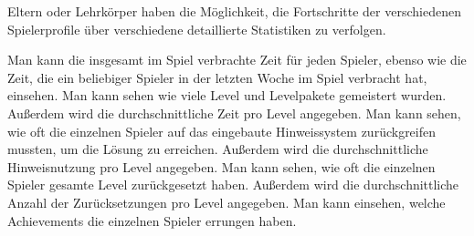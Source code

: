 \begin{requirements}
	Eltern oder Lehrkörper haben die Möglichkeit, die Fortschritte der verschiedenen Spielerprofile über verschiedene detaillierte Statistiken zu verfolgen.
	\begin{requirements}
		 Man kann die insgesamt im Spiel verbrachte Zeit für jeden Spieler, ebenso wie die Zeit, die ein beliebiger Spieler in der letzten Woche im Spiel verbracht hat, einsehen.
		 Man kann sehen wie viele Level und Levelpakete gemeistert wurden.
		Außerdem wird die durchschnittliche Zeit pro Level angegeben.
		 Man kann sehen, wie oft die einzelnen Spieler auf das eingebaute Hinweissystem zurückgreifen mussten, um die Lösung zu erreichen.
		Außerdem wird die durchschnittliche Hinweisnutzung pro Level angegeben.
		 Man kann sehen, wie oft die einzelnen Spieler gesamte Level zurückgesetzt haben.
		Außerdem wird die durchschnittliche Anzahl der Zurücksetzungen pro Level angegeben.
		 Man kann einsehen, welche Achievements die einzelnen Spieler errungen haben.
	\end{requirements}
\end{requirements}

